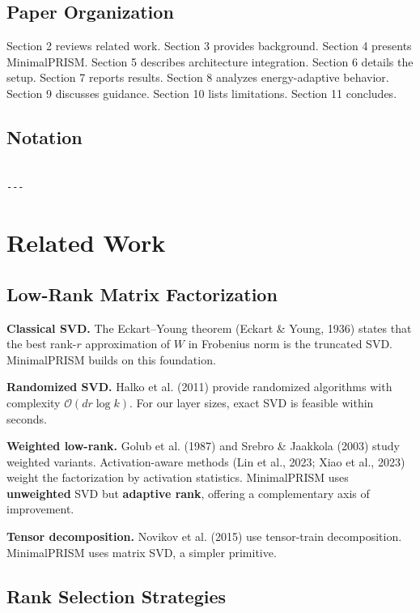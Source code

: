 \subsection{Paper Organization}

Section 2 reviews related work. Section 3 provides background. Section 4 
presents MinimalPRISM. Section 5 describes architecture integration. Section 
6 details the setup. Section 7 reports results. Section 8 analyzes 
energy-adaptive behavior. Section 9 discusses guidance. Section 10 lists 
limitations. Section 11 concludes.



\subsection{Notation}

\begin{lstlisting}

---
\end{lstlisting}


\section{Related Work}

\subsection{Low-Rank Matrix Factorization}

\textbf{Classical SVD.} The Eckart--Young theorem (Eckart \& Young, 1936) states 
that the best rank-$r$ approximation of $W$ in Frobenius norm is the 
truncated SVD. MinimalPRISM builds on this foundation.

\textbf{Randomized SVD.} Halko et al. (2011) provide randomized algorithms with 
complexity $\mathcal{O}(dr \log k)$. For our layer sizes, exact SVD is 
feasible within seconds.

\textbf{Weighted low-rank.} Golub et al. (1987) and Srebro \& Jaakkola (2003) study 
weighted variants. Activation-aware methods (Lin et al., 2023; Xiao et al., 
2023) weight the factorization by activation statistics. MinimalPRISM uses 
\textbf{unweighted} SVD but \textbf{adaptive rank}, offering a complementary axis of 
improvement.

\textbf{Tensor decomposition.} Novikov et al. (2015) use tensor-train 
decomposition. MinimalPRISM uses matrix SVD, a simpler primitive.

\subsection{Rank Selection Strategies}

